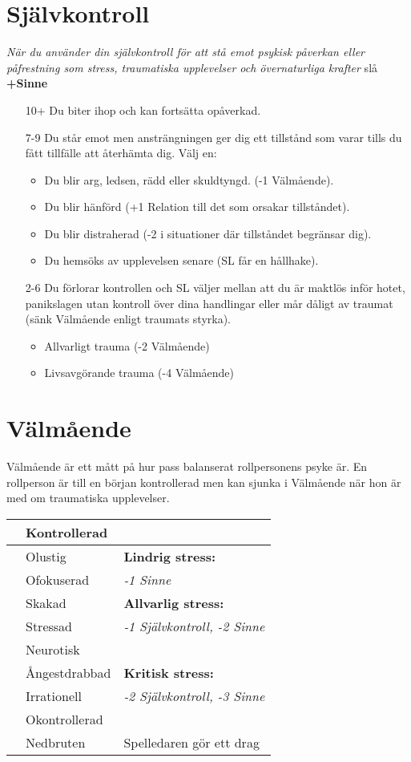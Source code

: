 \section{Självkontroll}
\textit{När du använder din självkontroll för att stå emot psykisk påverkan eller påfrestning som stress, traumatiska upplevelser och övernaturliga krafter} slå \textbf{+Sinne}
\begin{itemize}
  \item[10+] Du biter ihop och kan fortsätta opåverkad.
  \item[7-9] Du står emot men ansträngningen ger dig ett tillstånd som varar tills du fått tillfälle att återhämta dig. Välj en:
  \begin{itemize}
    \item Du blir arg, ledsen, rädd eller skuldtyngd. (-1 Välmående).
    \item Du blir hänförd (+1 Relation till det som orsakar tillståndet).
    \item Du blir distraherad (-2 i situationer där tillståndet begränsar dig).
    \item Du hemsöks av upplevelsen senare (SL får en hållhake).
  \end{itemize}
  \item[2-6] Du förlorar kontrollen och SL väljer mellan att du är maktlös inför hotet, panikslagen utan kontroll över dina handlingar eller  mår dåligt av traumat (sänk Välmående enligt traumats styrka).
  \begin{itemize}
    \item Allvarligt trauma (-2 Välmående)
    \item Livsavgörande trauma (-4 Välmående)
  \end{itemize}
\end{itemize}
\section{Välmående}
Välmående är ett mått på hur pass balanserat rollpersonens psyke är. En rollperson är till en början kontrollerad men kan sjunka i Välmående när hon är med om traumatiska upplevelser.
\begin{table}[!h]
\begin{tabular}{|c| l l|}
\hline & Kontrollerad & \\
\hline & Olustig & \textbf{Lindrig stress:} \\
& Ofokuserad &  \textit{-1 Sinne} \\
\hline & Skakad &  \textbf{Allvarlig stress:} \\
& Stressad & \textit{-1 Självkontroll, -2 Sinne} \\
& Neurotisk &  \\
\hline & Ångestdrabbad &  \textbf{Kritisk stress:} \\
 & Irrationell &  \textit{-2 Självkontroll, -3 Sinne} \\
 & Okontrollerad &  \\
\hline & Nedbruten & Spelledaren gör ett drag \\
\hline
\end{tabular}
\end{table}
